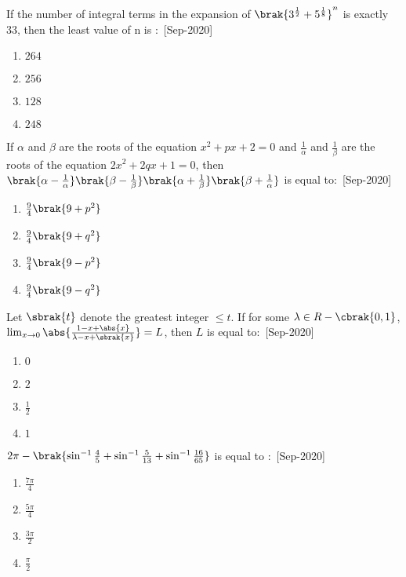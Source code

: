 \iffalse
    \title{2020}
    \author{EE24BTECH11021}
    \section{mcq-single}
\fi
   \item If the number of integral terms in the expansion of $\brak{3^{\frac{1}{2}}+5^{\frac{1}{8}}}^n$ is exactly $33$, then the least value of n is $\colon$
    \hfill{[Sep-2020]}
        \begin{enumerate}
            \item $264$
            \item $256$
            \item $128$
            \item $248$
        \end{enumerate}
    \item If $\alpha$ and $\beta$ are the roots of the equation $x^2+px+2=0$ and $\frac{1}{\alpha}$ and $\frac{1}{\beta}$ are the roots of the equation $2x^2+2qx+1=0$, then $\brak{\alpha-\frac{1}{\alpha}}\brak{\beta-\frac{1}{\beta}}\brak{\alpha + \frac{1}{\beta}}\brak{\beta +\frac{1}{\alpha}}$ is equal to$\colon$
    \hfill{[Sep-2020]}
        \begin{enumerate}
            \item $\frac{9}{4}\brak{9+p^2}$
            \item $\frac{9}{4}\brak{9+q^2}$
            \item $\frac{9}{4}\brak{9-p^2}$
            \item $\frac{9}{4}\brak{9-q^2}$
        \end{enumerate}
    \item Let $\sbrak{t}$ denote the greatest integer $\leq t$. If for some $\lambda\in R-\cbrak{0,1}$,\\
    $\lim_{x \to 0} \abs{\frac{1-x+\abs{x}}{\lambda-x+\sbrak{x}}}=L$, then $L$ is equal to$\colon$
   \hfill{[Sep-2020]}
        \begin{enumerate}
            \item $0$
            \item $2$
            \item $\frac{1}{2}$
            \item $1$
        \end{enumerate}
    \item $2\pi -\brak{\sin^{-1}{\frac{4}{5}}+\sin^{-1}{\frac{5}{13}}+\sin^{-1}{\frac{16}{65}}}$ is equal to $\colon$
    \hfill{[Sep-2020]}
        \begin{enumerate}
            \item $\frac{7\pi}{4}$
            \item $\frac{5\pi}{4}$
            \item $\frac{3\pi}{2}$
            \item $\frac{\pi}{2}$
        \end{enumerate}
